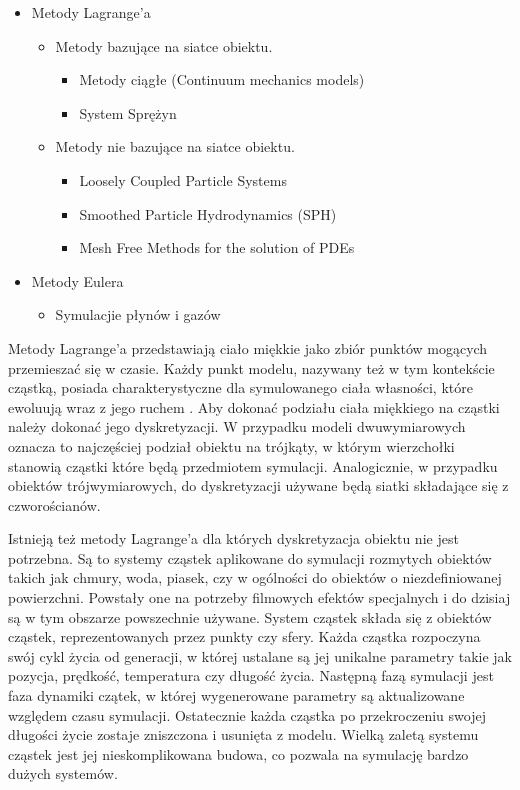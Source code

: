 \begin{itemize}
\item Metody Lagrange'a
	\begin{itemize}
	\item Metody bazujące na siatce obiektu.
		\begin{itemize}
			\item Metody ciągłe (Continuum mechanics models)
			\item System Sprężyn
		\end{itemize}
	\item Metody nie bazujące na siatce obiektu.
		\begin{itemize}
			\item Loosely Coupled Particle Systems 
			\item Smoothed Particle Hydrodynamics (SPH) 
			\item Mesh Free Methods for the solution of PDEs 
		\end{itemize}
	\end{itemize}
\item Metody Eulera
	\begin{itemize}
		\item Symulacjie płynów i gazów
	\end{itemize}
\end{itemize}

Metody Lagrange'a przedstawiają ciało miękkie jako zbiór punktów mogących
przemieszać się w czasie. Każdy punkt modelu, nazywany też w tym kontekście cząstką,
posiada charakterystyczne dla symulowanego ciała własności, które ewoluują wraz z jego ruchem
\cite{pbdo}. Aby dokonać podziału ciała miękkiego na cząstki należy
dokonać jego dyskretyzacji. W przypadku modeli dwuwymiarowych oznacza to
najczęściej podział obiektu na trójkąty, w którym wierzchołki stanowią
cząstki które będą przedmiotem symulacji. Analogicznie, w przypadku obiektów
trójwymiarowych,
do dyskretyzacji używane będą siatki składające się z czworościanów.

Istnieją też metody Lagrange'a dla których dyskretyzacja obiektu nie jest
potrzebna. Są to systemy cząstek aplikowane do symulacji rozmytych obiektów takich jak
chmury, woda, piasek, czy w ogólności do obiektów o niezdefiniowanej
powierzchni. Powstały one na potrzeby filmowych efektów specjalnych i do dzisiaj
są w tym obszarze powszechnie używane. System cząstek składa się z obiektów cząstek,
reprezentowanych przez punkty czy sfery. Każda cząstka
rozpoczyna swój cykl życia od generacji, w której ustalane są 
jej unikalne parametry takie jak pozycja, prędkość, temperatura czy długość życia.
Następną fazą symulacji jest faza dynamiki czątek, w której wygenerowane parametry
są aktualizowane względem czasu symulacji. Ostatecznie każda cząstka po
przekroczeniu swojej długości życie zostaje zniszczona i usunięta z modelu.
Wielką zaletą systemu cząstek jest jej nieskomplikowana budowa, co pozwala na
symulację bardzo dużych systemów. 


